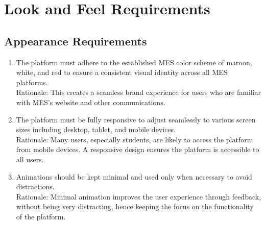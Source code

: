 \documentclass[12pt]{article}
\begin{document}
\section{Look and Feel Requirements}
\subsection{Appearance Requirements}
\begin{enumerate}
  \item The platform must adhere to the established MES color scheme of maroon, white, and red to ensure a consistent visual identity across all MES platforms. \\
  Rationale: This creates a seamless brand experience for users who are familiar with MES's website and other communications.
  \item The platform must be fully responsive to adjust seamlessly to various screen sizes including desktop, tablet, and mobile devices. \\
  Rationale: Many users, especially students, are likely to access the platform from mobile devices. A responsive design ensures the platform is accessible to all users.
  \item  Animations should be kept minimal and used only when necessary to avoid distractions. \\
  Rationale: Minimal animation improves the user experience through feedback, without being very distracting, hence keeping the focus on the functionality of the platform.
\end{enumerate}
\end{document}
